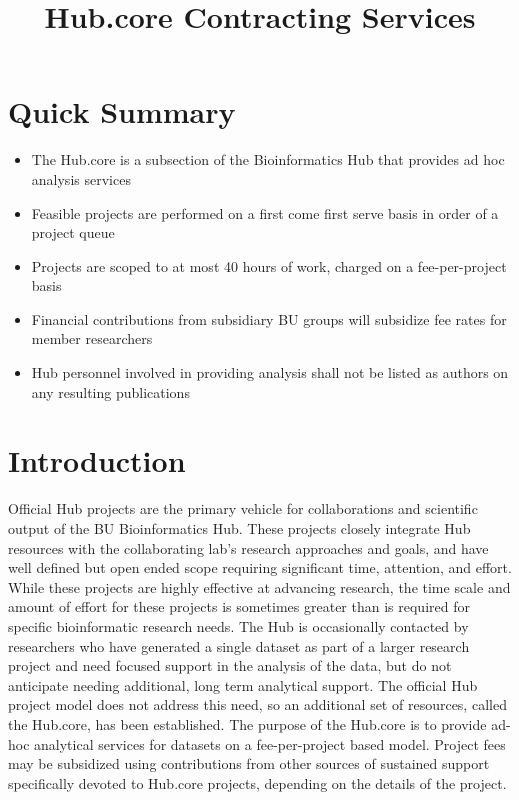 \documentclass[fleqn,10pt]{wlscirep}
\title{Hub.core Contracting Services}
\begin{document}
\flushbottom
\maketitle

\thispagestyle{empty}

\section{Quick Summary}

\begin{itemize}
    \item The Hub.core is a subsection of the Bioinformatics Hub that provides ad hoc analysis services
    \item Feasible projects are performed on a first come first serve basis in order of a project queue
    \item Projects are scoped to at most 40 hours of work, charged on a fee-per-project basis
    \item Financial contributions from subsidiary BU groups will subsidize fee rates for member researchers
    \item Hub personnel involved in providing analysis shall not be listed as authors on any resulting publications
\end{itemize}

\section{Introduction}

Official Hub projects are the primary vehicle for collaborations and scientific output of the BU Bioinformatics Hub.
These projects closely integrate Hub resources with the collaborating lab's research approaches and goals, and have well defined but open ended scope requiring significant time, attention, and effort.
While these projects are highly effective at advancing research, the time scale and amount of effort for these projects is sometimes greater than is required for specific bioinformatic research needs.
The Hub is occasionally contacted by researchers who have generated a single dataset as part of a larger research project and need focused support in the analysis of the data, but do not anticipate needing additional, long term analytical support.
The official Hub project model does not address this need, so an additional set of resources, called the Hub.core, has been established.
The purpose of the Hub.core is to provide ad-hoc analytical services for datasets on a fee-per-project based model.
Project fees may be subsidized using contributions from other sources of sustained support specifically devoted to Hub.core projects, depending on the details of the project.
\end{document}
